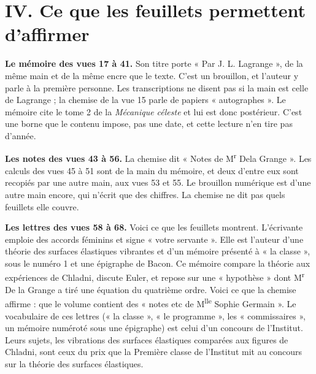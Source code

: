 \documentclass[11pt,a4paper]{article}
\begin{document}
\section*{IV. Ce que les feuillets permettent d'affirmer}

\textbf{Le mémoire des vues 17 à 41.} Son titre porte « Par J. L. Lagrange »,
de la même main et de la même encre que le texte. C'est un brouillon, et
l'auteur y parle à la première personne. Les transcriptions ne disent pas si
la main est celle de Lagrange ; la chemise de la vue 15 parle de papiers
« autographes ». Le mémoire cite le tome 2 de la \emph{Mécanique céleste} et
lui est donc postérieur. C'est une borne que le contenu impose, pas une date,
et cette lecture n'en tire pas d'année.

\textbf{Les notes des vues 43 à 56.} La chemise dit « Notes de
M\textsuperscript{r} Dela Grange ». Les calculs des vues 45 à 51 sont de la
main du mémoire, et deux d'entre eux sont recopiés par une autre main, aux
vues 53 et 55. Le brouillon numérique est d'une autre main encore, qui
n'écrit que des chiffres. La chemise ne dit pas quels feuillets elle couvre.

\textbf{Les lettres des vues 58 à 68.} Voici ce que les feuillets montrent.
L'écrivante emploie des accords féminins et signe « votre servante ». Elle est
l'auteur d'une théorie des surfaces élastiques vibrantes et d'un mémoire
présenté à « la classe », sous le numéro 1 et une épigraphe de Bacon. Ce
mémoire compare la théorie aux expériences de Chladni, discute Euler, et
repose sur une « hypothèse » dont M\textsuperscript{r} De la Grange a tiré une
équation du quatrième ordre. Voici ce que la chemise affirme : que le volume
contient des « notes etc de M\textsuperscript{lle} Sophie Germain ». Le
vocabulaire de ces lettres (« la classe », « le programme », les
« commissaires », un mémoire numéroté sous une épigraphe) est celui d'un
concours de l'Institut. Leurs sujets, les vibrations des surfaces élastiques
comparées aux figures de Chladni, sont ceux du prix que la Première classe de
l'Institut mit au concours sur la théorie des surfaces élastiques.
\end{document}

